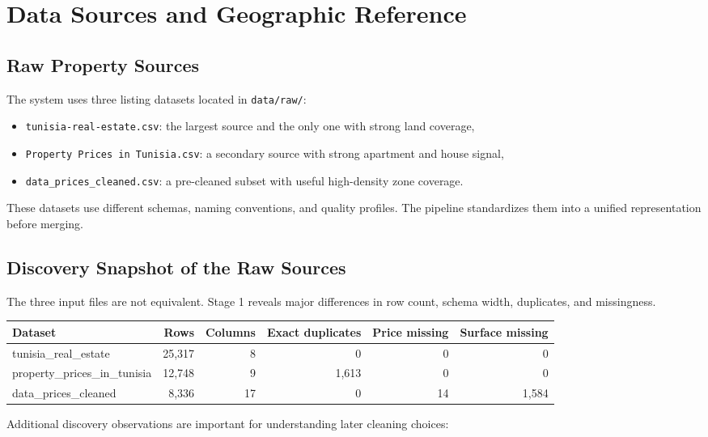 \documentclass[11pt,a4paper]{article}
\newcommand{\code}[1]{\texttt{#1}}
\begin{document}
\section{Data Sources and Geographic Reference}

\subsection{Raw Property Sources}

The system uses three listing datasets located in \code{data/raw/}:

\begin{itemize}
\item \code{tunisia-real-estate.csv}: the largest source and the only one with strong land coverage,
\item \code{Property Prices in Tunisia.csv}: a secondary source with strong apartment and house signal,
\item \code{data\_prices\_cleaned.csv}: a pre-cleaned subset with useful high-density zone coverage.
\end{itemize}

These datasets use different schemas, naming conventions, and quality profiles. The pipeline standardizes them into a unified representation before merging.

\subsection{Discovery Snapshot of the Raw Sources}

The three input files are not equivalent. Stage 1 reveals major differences in row count, schema width, duplicates, and missingness.

\begin{center}
\begin{tabularx}{\textwidth}{lrrrrr}
\toprule
Dataset & Rows & Columns & Exact duplicates & Price missing & Surface missing \\
\midrule
tunisia\_real\_estate & 25,317 & 8 & 0 & 0 & 0 \\
property\_prices\_in\_tunisia & 12,748 & 9 & 1,613 & 0 & 0 \\
data\_prices\_cleaned & 8,336 & 17 & 0 & 14 & 1,584 \\
\bottomrule
\end{tabularx}
\end{center}

Additional discovery observations are important for understanding later cleaning choices:
\end{document}
